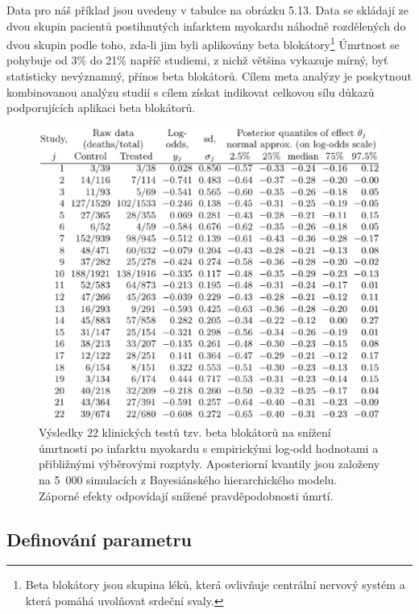 Data pro náš příklad jsou uvedeny v tabulce na obrázku 5.13. Data se skládají ze dvou skupin pacientů postihnutých infarktem myokardu náhodně rozdělených do dvou skupin podle toho, zda-li jim byli aplikovány beta blokátory\footnote{Beta blokátory jsou skupina léků, která ovlivňuje centrální nervový systém a která pomáhá uvolňovat srdeční svaly.} Úmrtnost se pohybuje od 3\% do 21\% napříč studiemi, z nichž většina vykazuje mírný, byť statisticky nevýznamný, přínos beta blokátorů. Cílem meta analýzy je poskytnout kombinovanou analýzu studií s cílem získat indikovat celkovou sílu důkazů podporujících aplikaci beta blokátorů.
\begin{figure}[htp]
\centering
\includegraphics[scale = 0.45]{pictures/tbl_5_5.eps}
\caption{Výsledky 22 klinických testů tzv. beta blokátorů na snížení úmrtnosti po infarktu myokardu s empirickými log-odd hodnotami a přibližnými výběrovými rozptyly. Aposteriorní kvantily jsou založeny na 5~000 simulacích z Bayesiánského hierarchického modelu. Záporné efekty odpovídají snížené pravděpodobnosti úmrtí.}
\label{tbl_5_5}
\end{figure}

\subsection{Definování parametru}

